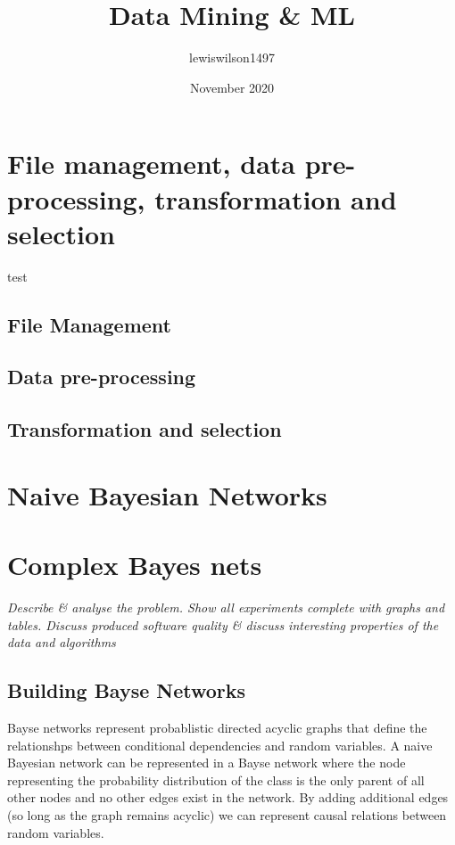 \documentclass[11pt]{article}
\title{Data Mining \& ML}
\author{lewiswilson1497 }
\date{November 2020}
\begin{document}
\maketitle

\pagebreak

\tableofcontents
\thispagestyle{empty}
\pagebreak
\setcounter{page}{1}

\pagebreak


\section{File management, data pre-processing, transformation and selection}

test

\subsection{File Management}

\subsection{Data pre-processing}

\subsection{Transformation and selection}\label{sec:transSel}


\pagebreak

\section{Naive Bayesian Networks}

\pagebreak

\section{Complex Bayes nets}
\emph{Describe \& analyse the problem. Show all experiments complete with graphs and tables. Discuss produced software quality \& discuss interesting properties of the data and algorithms}

\subsection{Building Bayse Networks}
Bayse networks represent probablistic directed acyclic graphs that define the relationshps between conditional dependencies and random variables.
A naive Bayesian network can be represented in a Bayse network where the node representing the probability distribution of the class is the only parent of all other nodes and no other edges exist in the network. 
By adding additional edges (so long as the graph remains acyclic) we can represent causal relations between random variables.
\end{document}
